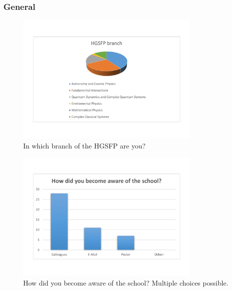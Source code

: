 \documentclass[11pt,a4paper]{article}
\numberwithin{equation}{section}
\numberwithin{table}{section}\setlength{\multlinegap}{25pt}
\begin{document}
\subsubsection{General}
\vspace{-1.5cm}
\begin{figure}[H]
\centering
\includegraphics[width=0.8\textwidth]{eval/general/hgsfp_branch.pdf}
\vspace{-1.0cm}
\caption{In which branch of the HGSFP are you?}
\end{figure}
\begin{figure}[H]
\centering
\includegraphics[width=0.8\textwidth]{eval/general/how_did_you_become_aware.pdf}
\vspace{-1.0cm}
\caption{How did you become aware of the school? Multiple choices possible.}
\end{figure}
\end{document}
